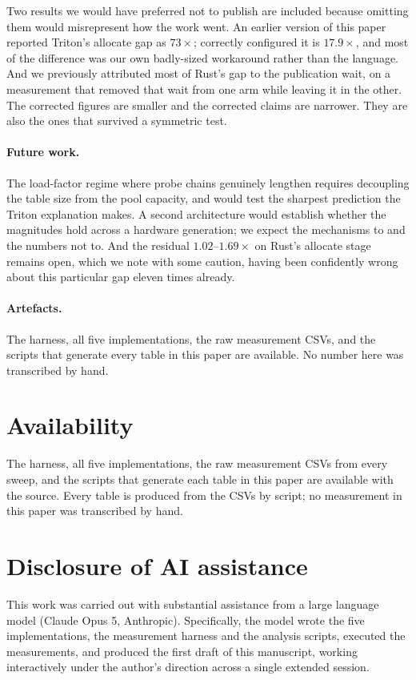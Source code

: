 \documentclass[11pt]{article}
\begin{document}
Two results we would have preferred not to publish are included because omitting
them would misrepresent how the work went. An earlier version of this paper
reported Triton's allocate gap as $73\times$; correctly configured it is
$17.9\times$, and most of the difference was our own badly-sized workaround
rather than the language. And we previously attributed most of Rust's gap to the
publication wait, on a measurement that removed that wait from one arm while
leaving it in the other. The corrected figures are smaller and the corrected
claims are narrower. They are also the ones that survived a symmetric test.

\paragraph{Future work.} The load-factor regime where probe chains genuinely
lengthen requires decoupling the table size from the pool capacity, and would
test the sharpest prediction the Triton explanation makes. A second architecture
would establish whether the magnitudes hold across a hardware generation; we
expect the mechanisms to and the numbers not to. And the residual
$1.02$--$1.69\times$ on Rust's allocate stage remains open, which we note with
some caution, having been confidently wrong about this particular gap eleven
times already.

\paragraph{Artefacts.} The harness, all five implementations, the raw
measurement CSVs, and the scripts that generate every table in this paper are
available. No number here was transcribed by hand.

\section*{Availability}

The harness, all five implementations, the raw measurement CSVs from every sweep,
and the scripts that generate each table in this paper are available with the
source. Every table is produced from the CSVs by script; no measurement in this
paper was transcribed by hand.

\section*{Disclosure of AI assistance}

This work was carried out with substantial assistance from a large language
model (Claude Opus 5, Anthropic). Specifically, the model wrote the five
implementations, the measurement harness and the analysis scripts, executed the
measurements, and produced the first draft of this manuscript, working
interactively under the author's direction across a single extended session.
\end{document}
